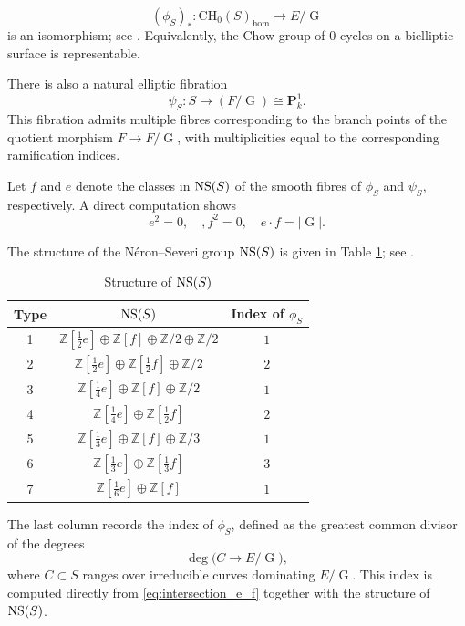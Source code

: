 \documentclass[11pt,letterpaper]{amsart}
\newcommand{\NS}{\textnormal{NS}}
\numberwithin{equation}{section}
\theoremstyle{definition}
\theoremstyle{remark}
\newcommand{\Z}{\mathbb{Z}}
\newcommand{\bbP}{\mathbf{P}}
\newcommand{\Ch}{\operatorname{CH_{0}}}
\DeclareMathOperator{\Gi}{G}
\begin{document}
$$(\phi_{S})_{\ast}\colon\Ch(S)_{\hom}\longrightarrow E/\Gi$$
is an isomorphism; see \cite[Example (2)]{bloch-srinivas}. Equivalently, the Chow group of $0$-cycles on a bielliptic surface is representable.\par
There is also a natural elliptic fibration $$\psi_{S}\colon S\longrightarrow (F/\Gi)\cong\bbP^{1}_{k}.$$ 
This fibration admits multiple fibres corresponding to the branch points of the quotient morphism $F \to F/\Gi$, with multiplicities equal to the corresponding ramification indices.\par
Let $f$ and $e$ denote the classes in $\NS(S)$ of the smooth fibres of $\phi_S$ and $\psi_S$, respectively. A direct computation shows \begin{equation}\label{eq:intersection_e_f}e^2=0,\quad,f^2=0,\quad e\cdot f=|\Gi|.\end{equation}

The structure of the Néron--Severi group $\NS(S)$ is given in Table \ref{tab:bielliptic_coh}; see \cite[Table 2]{Serrano1990}.

\renewcommand{\arraystretch}{1.5}
\begin{table}[h]
\centering
\caption{Structure of $\NS(S)$}
\label{tab:bielliptic_coh}
\begin{tabular}{c c c}
\hline
\textbf{Type} & \textbf{$\NS(S)$} & \textbf{Index of $\phi_S$} \\
\hline
1 & $\Z[\tfrac{1}{2}e] \oplus \Z[f] \oplus \Z/2 \oplus \Z/2$ & $1$ \\
2 & $\Z[\tfrac{1}{2}e] \oplus \Z[\tfrac{1}{2}f] \oplus \Z/2$ & $2$ \\
3 & $\Z[\tfrac{1}{4}e] \oplus \Z[f] \oplus \Z/2$ & $1$ \\
4 & $\Z[\tfrac{1}{4}e] \oplus \Z[\tfrac{1}{2}f]$ & $2$ \\
5 & $\Z[\tfrac{1}{3}e] \oplus \Z[f] \oplus \Z/3$ & $1$ \\
6 & $\Z[\tfrac{1}{3}e] \oplus \Z[\tfrac{1}{3}f]$ & $3$ \\
7 & $\Z[\tfrac{1}{6}e] \oplus \Z[f]$ & $1$ \\
\hline
\end{tabular}
\end{table}

\par The last column records the index of $\phi_S$, defined as the greatest common divisor of the degrees
$$
\deg\bigl(C \longrightarrow E/\Gi\bigr),
$$
where $C \subset S$ ranges over irreducible curves dominating $E/\Gi$. This index is computed directly from \eqref{eq:intersection_e_f} together with the structure of $\NS(S)$.\par
\end{document}

